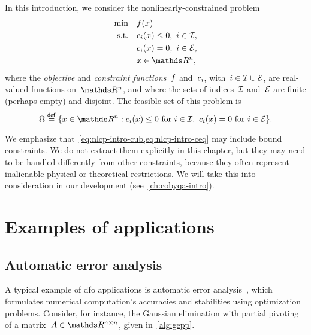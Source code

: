 In this introduction, we consider the nonlinearly-constrained problem
\begin{subequations}
    \label{eq:nlcp-intro}
    \begin{align}
        \min        & \quad \obj(x)\\
        \text{s.t.} & \quad \con{i}(x) \le 0, ~ i \in \iub, \label{eq:nlcp-intro-cub}\\
                    & \quad \con{i}(x) = 0, ~ i \in \ieq, \label{eq:nlcp-intro-ceq}\\
                    & \quad x \in \R^n, \nonumber
    \end{align}
\end{subequations}
where the \emph{objective} and \emph{constraint functions}~$f$ and~$c_{i}$, with~$i \in \mathcal{I} \cup \mathcal{E}$, are real-valued functions on~$\R^n$, and where the sets of indices~$\mathcal{I}$ and~$\mathcal{E}$ are finite (perhaps empty) and disjoint.
The feasible set of this problem is
\begin{equation*}
    \Omega \eqdef \set{x \in \R^n \mathrel{:} \con{i}(x) \le 0 ~ \text{for~$i \in \iub$}, ~ \con{i}(x) = 0 ~ \text{for~$i \in \ieq$}}.
\end{equation*}

We emphasize that~\cref{eq:nlcp-intro-cub,eq:nlcp-intro-ceq} may include bound constraints.
We do not extract them explicitly in this chapter, but they may need to be handled differently from other constraints, because they often represent inalienable physical or theoretical restrictions.
We will take this into consideration in our development (see~\cref{ch:cobyqa-intro}).

\section{Examples of applications}

\subsection{Automatic error analysis}

A typical example of \gls{dfo} applications is automatic error analysis~\cite{Higham_1993,Higham_2002}, which formulates numerical computation's accuracies and stabilities using optimization problems.
Consider, for instance, the Gaussian elimination with partial pivoting of a matrix~$A \in \R^{n \times n}$, given in~\cref{alg:gepp}.

